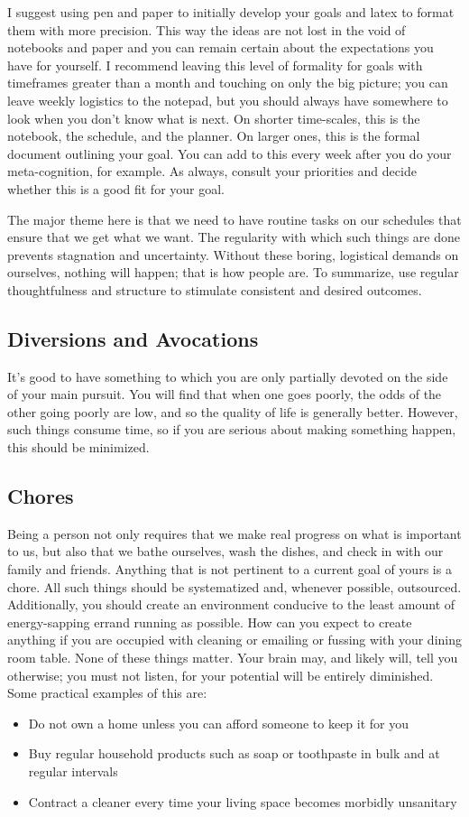 \documentclass{book}
\numberwithin{equation}{section}
\begin{document}
I suggest using pen and paper to initially develop your goals and latex to format them with more precision. This way the ideas are not lost in the void of notebooks and paper and you can remain certain about the expectations you have for yourself. I recommend leaving this level of formality for goals with timeframes greater than a month and touching on only the big picture; you can leave weekly logistics to the notepad, but you should always have somewhere to look when you don't know what is next. On shorter time-scales, this is the notebook, the schedule, and the planner. On larger ones, this is the formal document outlining your goal. You can add to this every week after you do your meta-cognition, for example. As always, consult your priorities and decide whether this is a good fit for your goal.

The major theme here is that we need to have routine tasks on our schedules that ensure that we get what we want. The regularity with which such things are done prevents stagnation and uncertainty. Without these boring, logistical demands on ourselves, nothing will happen; that is how people are. To summarize, use regular thoughtfulness and structure to stimulate consistent and desired outcomes.
\subsection{Diversions and Avocations}
It's good to have something to which you are only partially devoted on the side of your main pursuit. You will find that when one goes poorly, the odds of the other going poorly are low, and so the quality of life is generally better. However, such things consume time, so if you are serious about making something happen, this should be minimized.
\subsection{Chores}
Being a person not only requires that we make real progress on what is important to us, but also that we bathe ourselves, wash the dishes, and check in with our family and friends. Anything that is not pertinent to a current goal of yours is a chore. All such things should be systematized and, whenever possible, outsourced. Additionally, you should create an environment conducive to the least amount of energy-sapping errand running as possible. How can you expect to create anything if you are occupied with cleaning or emailing or fussing with your dining room table. None of these things matter. Your brain may, and likely will, tell you otherwise; you must not listen, for your potential will be entirely diminished.
Some practical examples of this are:
\begin{itemize}
    \item Do not own a home unless you can afford someone to keep it for you
    \item Buy regular household products such as soap or toothpaste in bulk and at regular intervals
    \item Contract a cleaner every time your living space becomes morbidly unsanitary
\end{itemize}
\end{document}

